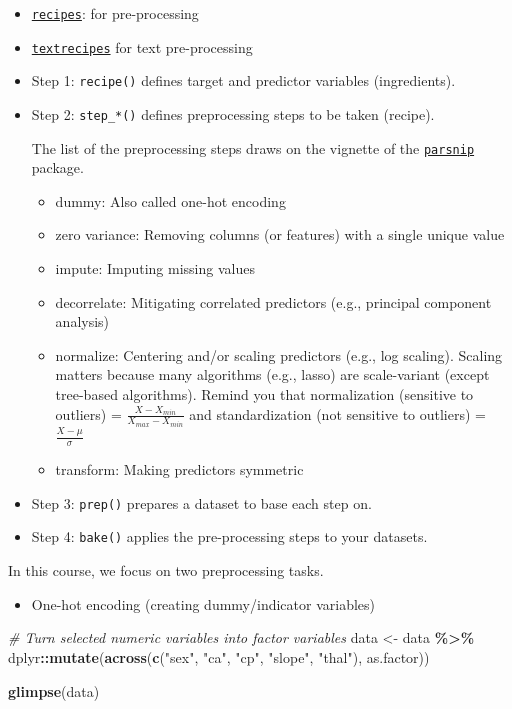 \documentclass[
]{book}
\newenvironment{Shaded}{\begin{snugshade}}{\end{snugshade}}
\newcommand{\CommentTok}[1]{\textcolor[rgb]{0.56,0.35,0.01}{\textit{#1}}}
\newcommand{\KeywordTok}[1]{\textcolor[rgb]{0.13,0.29,0.53}{\textbf{#1}}}
\newcommand{\NormalTok}[1]{#1}
\newcommand{\OperatorTok}[1]{\textcolor[rgb]{0.81,0.36,0.00}{\textbf{#1}}}
\newcommand{\StringTok}[1]{\textcolor[rgb]{0.31,0.60,0.02}{#1}}
\providecommand{\tightlist}{%
  \setlength{\itemsep}{0pt}\setlength{\parskip}{0pt}}
\begin{document}
\begin{itemize}
\item
  \href{https://recipes.tidymodels.org/index.html}{\texttt{recipes}}: for pre-processing
\item
  \href{https://github.com/tidymodels/textrecipes}{\texttt{textrecipes}} for text pre-processing
\item
  Step 1: \texttt{recipe()} defines target and predictor variables (ingredients).
\item
  Step 2: \texttt{step\_*()} defines preprocessing steps to be taken (recipe).

  The list of the preprocessing steps draws on the vignette of the \href{https://www.tidymodels.org/find/parsnip/}{\texttt{parsnip}} package.

  \begin{itemize}
  \item
    dummy: Also called one-hot encoding
  \item
    zero variance: Removing columns (or features) with a single unique value
  \item
    impute: Imputing missing values
  \item
    decorrelate: Mitigating correlated predictors (e.g., principal component analysis)
  \item
    normalize: Centering and/or scaling predictors (e.g., log scaling). Scaling matters because many algorithms (e.g., lasso) are scale-variant (except tree-based algorithms). Remind you that normalization (sensitive to outliers) = \(\frac{X - X_{min}}{X_{max} - X_{min}}\) and standardization (not sensitive to outliers) = \(\frac{X - \mu}{\sigma}\)
  \item
    transform: Making predictors symmetric
  \end{itemize}
\item
  Step 3: \texttt{prep()} prepares a dataset to base each step on.
\item
  Step 4: \texttt{bake()} applies the pre-processing steps to your datasets.
\end{itemize}

In this course, we focus on two preprocessing tasks.

\begin{itemize}
\tightlist
\item
  One-hot encoding (creating dummy/indicator variables)
\end{itemize}

\begin{Shaded}
\begin{Highlighting}[]
\CommentTok{\# Turn selected numeric variables into factor variables }
\NormalTok{data \textless{}{-}}\StringTok{ }\NormalTok{data }\OperatorTok{\%\textgreater{}\%}
\StringTok{  }\NormalTok{dplyr}\OperatorTok{::}\KeywordTok{mutate}\NormalTok{(}\KeywordTok{across}\NormalTok{(}\KeywordTok{c}\NormalTok{(}\StringTok{"sex"}\NormalTok{, }\StringTok{"ca"}\NormalTok{, }\StringTok{"cp"}\NormalTok{, }\StringTok{"slope"}\NormalTok{, }\StringTok{"thal"}\NormalTok{), as.factor)) }

\KeywordTok{glimpse}\NormalTok{(data) }
\end{Highlighting}
\end{Shaded}
\end{document}

